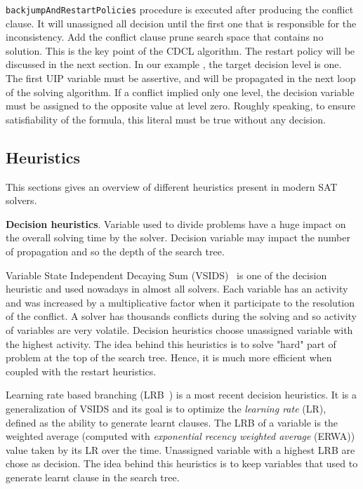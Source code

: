\texttt{backjumpAndRestartPolicies} procedure is executed after producing the conflict clause.
It will unassigned all
decision until the first one that is responsible for the inconsistency. Add the conflict clause prune search space that 
contains no solution. This is the key point of the CDCL algorithm. The restart policy will be discussed in the next section.
In our example , the target decision level is one. The first UIP variable must be assertive,
and will be propagated in the next loop of the solving algorithm.
If a conflict implied only one level, the decision variable must be assigned to the opposite value at level zero.
Roughly speaking, to ensure satisfiability of the formula, this literal must be true without any decision.

 
\subsection{Heuristics}\label{sec:heuristics}
This sections gives an overview of different heuristics present in modern SAT solvers.

\textbf{Decision heuristics}. Variable used to divide problems have a huge impact on the 
overall solving time by the solver. Decision variable may impact the number of propagation and so 
the depth of the search tree.

Variable State Independent Decaying Sum (VSIDS)~\cite{moskewicz2001chaff} is one of the decision heuristic and used
nowadays in almost all solvers. Each variable has an activity and was increased by a multiplicative factor 
when it participate to the resolution of the conflict.
A solver has thousands conflicts during the solving and so activity of variables are very volatile.
Decision heuristics choose unassigned variable with the highest activity.
The idea behind this heuristics is to solve "hard" part of problem at the top of the search tree.
Hence, it is much more efficient when coupled with the restart heuristics. 

Learning rate based branching (LRB~\cite{liang2016learning}) is a most recent decision heuristics. It is a
generalization of VSIDS and its goal is to optimize the \emph{learning rate} (LR), defined as the ability to generate
learnt clauses. The LRB of a variable is the weighted average (computed with \emph{exponential recency
weighted average} (ERWA))  value taken by its LR over the time. Unassigned variable with a highest LRB are chose as decision. 
The idea behind this heuristics is to keep variables that used to generate learnt clause in the search tree.


